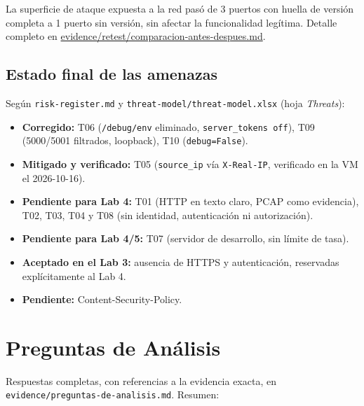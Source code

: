 \documentclass[journal]{IEEEtran}
\begin{document}
La superficie de ataque expuesta a la red pasó de 3 puertos con huella de
versión completa a 1 puerto sin versión, sin afectar la funcionalidad
legítima. Detalle completo en \url{evidence/retest/comparacion-antes-despues.md}.

\subsection{Estado final de las amenazas}

Según \texttt{risk-register.md} y \texttt{threat-model/threat-model.xlsx}
(hoja \textit{Threats}):

\begin{itemize}
    \item \textbf{Corregido:} T06 (\texttt{/debug/env} eliminado,
    \texttt{server\_tokens off}), T09 (5000/5001 filtrados, loopback), T10
    (\texttt{debug=False}).
    \item \textbf{Mitigado y verificado:} T05 (\texttt{source\_ip} vía
    \texttt{X-Real-IP}, verificado en la VM el 2026-10-16).
    \item \textbf{Pendiente para Lab 4:} T01 (HTTP en texto claro, PCAP como
    evidencia), T02, T03, T04 y T08 (sin identidad, autenticación ni
    autorización).
    \item \textbf{Pendiente para Lab 4/5:} T07 (servidor de desarrollo, sin
    límite de tasa).
    \item \textbf{Aceptado en el Lab 3:} ausencia de HTTPS y autenticación,
    reservadas explícitamente al Lab 4.
    \item \textbf{Pendiente:} Content-Security-Policy.
\end{itemize}

\section{Preguntas de Análisis}
\label{sec:preguntas}

Respuestas completas, con referencias a la evidencia exacta, en
\texttt{evidence/preguntas-de-analisis.md}. Resumen:
\end{document}
